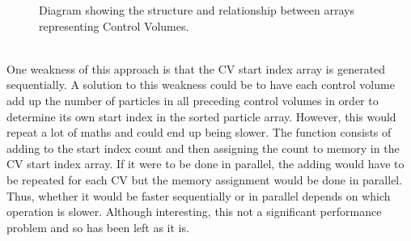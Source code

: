 \documentclass[10pt,a4paper,titlepage]{report}
\begin{document}
\begin{figure}[!ht]
\centering

\caption{Diagram showing the structure and relationship between arrays representing Control Volumes.}
\label{fig:cv_array_structure}
\end{figure}
\\One weakness of this approach is that the CV start index array is generated sequentially. A solution to this weakness could be to have each control volume add up the number of particles in all preceding control volumes in order to determine its own start index in the sorted particle array. However, this would repeat a lot of maths and could end up being slower. The function consists of adding to the start index count and then assigning the count to memory in the CV start index array. If it were to be done in parallel, the adding would have to be repeated for each CV but the memory assignment would be done in parallel. Thus, whether it would be faster sequentially or in parallel depends on which operation is slower. Although interesting, this not a significant performance problem and so has been left as it is.
\end{document}
